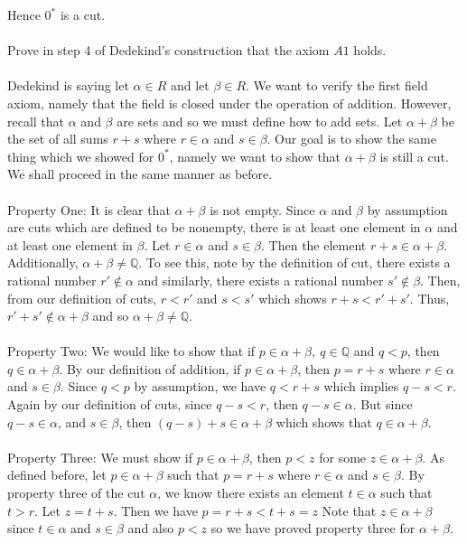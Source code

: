 \documentclass[12pt]{article}
\begin{document}
\noindent Hence $0^{*}$ is a cut. \\ \\
 
\problem
Prove in step 4 of Dedekind's  construction that the axiom $A1$ holds. \\ \\
Dedekind is saying let $\alpha \in R$ and let $\beta \in R$. We want to verify the first field axiom, namely that the field is closed under the operation of addition. However, recall that $\alpha$ and $\beta$ are sets and so we must define how to add sets. Let $\alpha + \beta$ be the set of all sums $r+s$ where $r \in \alpha$ and $s \in \beta$. Our goal is to show the same thing which we showed for $0^{*}$, namely we want to show that $\alpha + \beta$ is still a cut. We shall proceed in the same manner as before. \\ \\
Property One: It is clear that $\alpha + \beta$ is not empty. Since $\alpha$ and $\beta$ by assumption are cuts which are defined to be nonempty, there is at least one element in $\alpha$ and at least one element in $\beta$. Let $r \in \alpha$ and $s \in \beta$. Then the element $r+s \in \alpha + \beta$. \\
Additionally, $\alpha + \beta \neq \mathbb{Q}$. To see this, note by the definition of cut, there exists a rational number $r' \notin \alpha$ and similarly, there exists a rational number $s' \notin \beta$. Then, from our definition of cuts, $r<r'$ and $s<s'$ which shows $r+s<r'+s'$. Thus, $r' +s' \notin \alpha + \beta$ and so $\alpha + \beta \neq \mathbb{Q}$.  \\ \\
Property Two: We would like to show that if $p \in \alpha + \beta,~q \in \mathbb{Q}$ and $q<p$, then $q \in \alpha + \beta$. By our definition of addition, if $p \in \alpha + \beta$, then $p=r+s$ where $r \in \alpha$ and $s \in \beta$. Since $q<p$ by assumption, we have $q<r+s$ which implies $q-s<r$. Again by our definition of cuts, since $q-s<r$, then $q-s \in \alpha$. But since $q-s \in \alpha$, and $s \in \beta$, then $(q-s)+s \in \alpha + \beta$ which shows that $q \in \alpha + \beta$. \\ \\ 
Property Three: We must show if $p \in \alpha + \beta$, then $p<z$ for some $z \in \alpha + \beta$. As defined before, let $p \in \alpha + \beta$ such that $p=r+s$ where $r \in \alpha$ and $s \in \beta$. By property three of the cut $\alpha$, we know there exists an element $t \in \alpha$ such that $t>r$. Let $z=t+s$. Then we have $p=r+s < t + s = z$ Note that $z \in \alpha + \beta$ since $t \in \alpha$ and $s \in \beta$ and also $p<z$ so we have proved property three for $\alpha + \beta$. 
\end{document}
